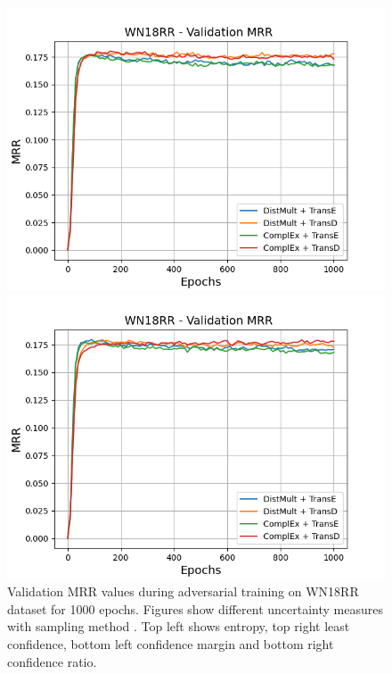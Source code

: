 \begin{figure}[H]
\begin{minipage}{.45\textwidth}
    \end{minipage}
    \begin{minipage}{.45\textwidth}
      \centering
      \includegraphics[width=0.9\linewidth]{figures/results/gan_train/not_pretrained/uncertainty/max_distribution/confidence_margin/wn18rr/uncertainty_wn18rr_mrrs.png}
    \end{minipage}%
    \begin{minipage}{.45\textwidth}
      \centering
      \includegraphics[width=0.9\linewidth]{figures/results/gan_train/not_pretrained/uncertainty/max_distribution/confidence_ratio/wn18rr/uncertainty_wn18rr_mrrs.png}
    \end{minipage}%
    \caption{Validation MRR values during adversarial training on \textsc{WN18RR} dataset for 1000 epochs. 
    Figures show different uncertainty measures with sampling method  \ussoftmax.
    Top left shows entropy, top right least confidence, 
    bottom left confidence margin and bottom right confidence ratio.}
    \label{fig:advtrain_metrics_wn18rr}
\end{figure}

